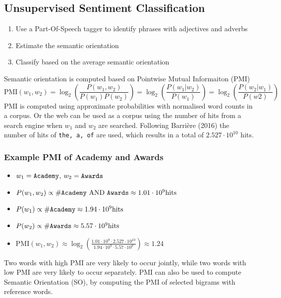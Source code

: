 \documentclass[11pt]{article}
\begin{document}
\subsection{Unsupervised Sentiment Classification}
\begin{enumerate}
	\item Use a Part-Of-Speech tagger to identify phrases with adjectives and adverbs
	\item Estimate the semantic orientation
	\item Classify based on the average semantic orientation
\end{enumerate}
Semantic orientation is computed based on Pointwise Mutual Informaiton (PMI)
\begin{equation*}
\text{PMI} (w_1,w_2) = \log_2 \left( \frac{P(w_1,w_2)}{P(w_1)P(w_2)} \right) = \log_2 \left( \frac{P(w_1 | w_2)}{P(w_1)} \right) = \log_2 \left( \frac{P(w_2 | w_1)}{P(w2)} \right)
\end{equation*}
PMI is computed using approximate probabilities with normalised word counts in a corpus. Or the web can be used as a corpus using the number of hits from a search engine when $w_1$ and $w_2$ are searched. Following Barrière (2016) the number of hits of \texttt{the, a, of} are used, which results in a total of $2.527\cdot 10^10$ hits.
\subsubsection{Example PMI of Academy and Awards}
\begin{itemize}
	\item $w_1 = \text{\texttt{Academy}}$, $w_2 = \text{\texttt{Awards}}$
	\item $P(w_1,w_2) \propto \text{\#\texttt{Academy} AND \texttt{Awards}} \approx 1.01\cdot 10^9\text{hits}$
	\item $P(w_1) \propto \text{\#\texttt{Academy}} \approx 1.94\cdot 10^9 \text{hits}$
	\item $P(w_2) \propto\text{\#\texttt{Awards}} \approx 5.57\cdot 10^9\text{hits} $
	\item $\text{PMI}(w_1,w_2) \approx \log_2\left( \frac{1.01\cdot 10^9\cdot2.527\cdot 10^10}{1.94\cdot 10^9\cdot 5.57\cdot 10^9} \right)\approx 1.24 $
\end{itemize}
Two words with high PMI are very likely to occur jointly, while two words with low PMI are very likely to occur separately. PMI can also be used to compute Semantic Orientation (SO), by computing the PMI of selected bigrams with reference words.
\end{document}
